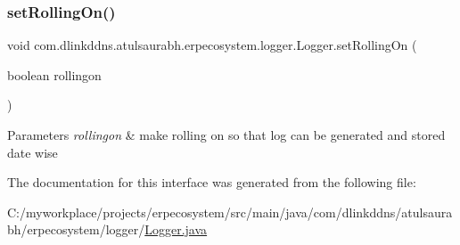 \subsubsection{\texorpdfstring{set\+Rolling\+On()}{setRollingOn()}}
{\footnotesize\ttfamily void com.\+dlinkddns.\+atulsaurabh.\+erpecosystem.\+logger.\+Logger.\+set\+Rolling\+On (\begin{DoxyParamCaption}\item[{boolean}]{rollingon }\end{DoxyParamCaption})}


\begin{DoxyParams}{Parameters}
{\em rollingon} & make rolling on so that log can be generated and stored date wise \\
\hline
\end{DoxyParams}


The documentation for this interface was generated from the following file\+:\begin{DoxyCompactItemize}
\item 
C\+:/myworkplace/projects/erpecosystem/src/main/java/com/dlinkddns/atulsaurabh/erpecosystem/logger/\mbox{\hyperlink{_logger_8java}{Logger.\+java}}\end{DoxyCompactItemize}
